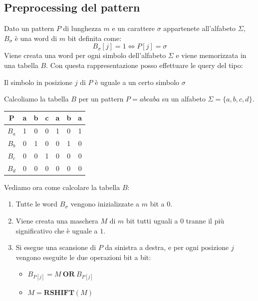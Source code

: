 \subsection{Preprocessing del pattern} \label{subsec:preprocessing}
Dato un pattern $P$ di lunghezza $m$ e un carattere $\sigma$ appartenete
all'alfabeto $\Sigma$, $B_{\sigma}$ è una word di $m$ bit definita come:
\begin{equation}
    B_{\sigma}[j] = 1 \iff P[j] = \sigma
\end{equation}
Viene creata una word per ogni simbolo dell'alfabeto $\Sigma$ e viene memorizzata
in una tabella $B$. Con questa rappresentazione posso effettuare le query del tipo:
\begin{center}
    Il simbolo in posizione $j$ di $P$ è uguale a un certo simbolo $\sigma$
\end{center}
\begin{esempio}
    Calcoliamo la tabella $B$ per un pattern $P=abcaba$ su un alfabeto $\Sigma =
        \{a, b, c, d\}$.
    \begin{table}[!ht]
        \centering
        \begin{tabular}{|c|c|c|c|c|c|c|}
            \hline
            P     & a & b & c & a & b & a \\ \hline
            $B_a$ & 1 & 0 & 0 & 1 & 0 & 1 \\ \hline
            $B_b$ & 0 & 1 & 0 & 0 & 1 & 0 \\ \hline
            $B_c$ & 0 & 0 & 1 & 0 & 0 & 0 \\ \hline
            $B_d$ & 0 & 0 & 0 & 0 & 0 & 0 \\ \hline
        \end{tabular}
    \end{table}
\end{esempio}
Vediamo ora come calcolare la tabella $B$:
\begin{enumerate}
    \item Tutte le word $B_{\sigma}$ vengono inizializzate a $m$ bit a $0$.
    \item Viene creata una maschera $M$ di $m$ bit tutti uguali a $0$ tranne il
          più significativo che è uguale a $1$.
    \item Si esegue una scansione di $P$ da sinistra a destra, e per ogni posizione
          $j$ vengono eseguite le due operazioni bit a bit:
          \begin{itemize}
              \item $B_{P[j]} = M \ \textbf{OR} \ B_{P[j]}$
              \item $M = \textbf{RSHIFT} (M)$
          \end{itemize}
\end{enumerate}

